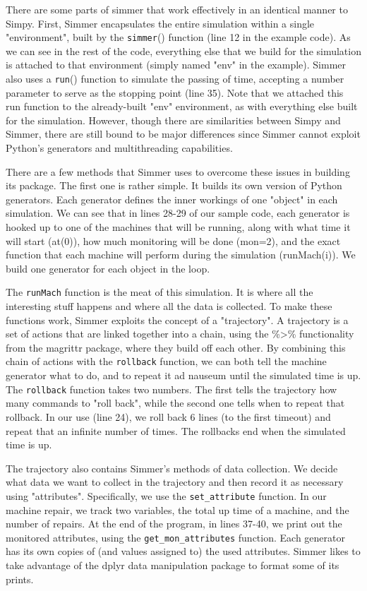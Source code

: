 \documentclass[a4paper, 11pt]{article} %
\begin{document}
There are some parts of simmer that work effectively in an identical manner to Simpy. First, Simmer encapsulates the entire simulation within a single "environment", built by the \texttt{simmer}() function (line 12 in the example code). As we can see in the rest of the code, everything else that we build for the simulation is attached to that environment (simply named "env" in the example). Simmer also uses a \texttt{run}() function to simulate the passing of time, accepting a number parameter to serve as the stopping point (line 35). Note that we attached this run function to the already-built "env" environment, as with everything else built for the simulation. However, though there are similarities between Simpy and Simmer, there are still bound to be major differences since Simmer cannot exploit Python's generators and multithreading capabilities.


There are a few methods that Simmer uses to overcome these issues in building its package. The first one is rather simple. It builds its own version of Python generators. Each generator defines the inner workings of one "object" in each simulation. We can see that in lines 28-29 of our sample code, each generator is hooked up to one of the machines that will be running, along with what time it will start (at(0)), how much monitoring will be done (mon=2), and the exact function that each machine will perform during the simulation (runMach(i)). We build one generator for each object in the loop. \pagebreak


The \texttt{runMach} function is the meat of this simulation. It is where all the interesting stuff happens and where all the data is collected. To make these functions work, Simmer exploits the concept of a "trajectory". A trajectory is a set of actions that are linked together into a chain, using the \%>\% functionality from the magrittr package, where they build off each other. By combining this chain of actions with the \texttt{rollback} function, we can both tell the machine generator what to do, and to repeat it ad nauseum until the simulated time is up. The \texttt{rollback} function takes two numbers. The first tells the trajectory how many commands to "roll back", while the second one tells when to repeat that rollback. In our use (line 24), we roll back 6 lines (to the first timeout) and repeat that an infinite number of times. The rollbacks end when the simulated time is up.


The trajectory also contains Simmer's methods of data collection. We decide what data we want to collect in the trajectory and then record it as necessary using "attributes". Specifically, we use the \texttt{set\_attribute} function. In our machine repair, we track two variables, the total up time of a machine, and the number of repairs. At the end of the program, in lines 37-40, we print out the monitored attributes, using the \texttt{get\_mon\_attributes} function. Each generator has its own copies of (and values assigned to) the used attributes. Simmer likes to take advantage of the dplyr data manipulation package to format some of its prints. \newline






\end{document}
